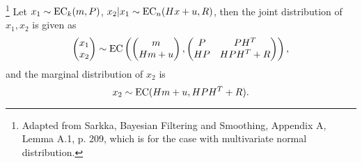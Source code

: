 \begin{lemma} \label{L:ell_joint}
\footnote{Adapted from Sarkka, Bayesian Filtering and Smoothing, Appendix A, 
	Lemma A.1, p. 209, which is for the case with multivariate normal
	distribution.}
Let $x_1\sim \operatorname*{EC}_k(m,P)$, $x_2|x_1 \sim \operatorname*{EC}_n (H x + u, R)$, then the joint
distribution of $x_1,x_2$ is given as
\[
  \begin{pmatrix}
    x_1 \\
    x_2 \\
  \end{pmatrix}
  \sim
  \operatorname*{EC} 
    \left(
	  \begin{pmatrix}
        m \\
        Hm+u \\
      \end{pmatrix},
	  \begin{pmatrix}
        P    & PH^T \\
        HP   & HPH^T + R \\
      \end{pmatrix}
    \right),
\]
and the marginal distribution of $x_2$ is 
\[
  x_2\sim \operatorname*{EC} (Hm + u, HPH^T + R).
\]
\end{lemma}
